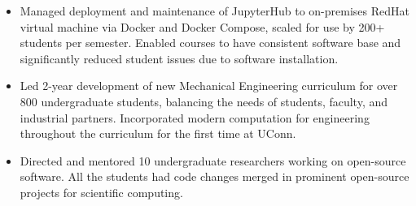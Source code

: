 \begin{itemize}
\item Managed deployment and maintenance of JupyterHub to on-premises RedHat virtual machine via Docker and Docker Compose, scaled for use by 200+ students per semester. Enabled courses to have consistent software base and significantly reduced student issues due to software installation.
\item Led 2-year development of new Mechanical Engineering curriculum for over 800 undergraduate students, balancing the needs of students, faculty, and industrial partners. Incorporated modern computation for engineering throughout the curriculum for the first time at UConn.
\item Directed and mentored 10 undergraduate researchers working on open-source software. All the students had code changes merged in prominent open-source projects for scientific computing.
\end{itemize}
\sectionsep

\\
\\

